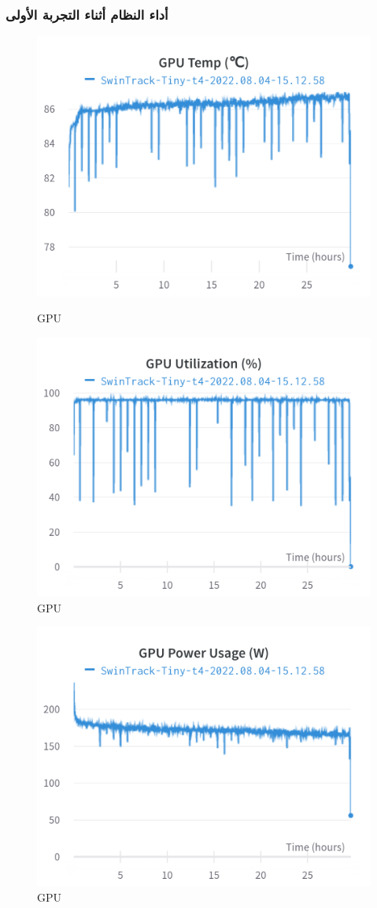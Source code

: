 \subsubsection{أداء النظام أثناء التجربة الأولى}
\begin{figure}[H]
	\includegraphics[width=0.7\linewidth]{charts/Section-4-Panel-10-ez7r8q2s1}
	\caption{
		GPU
		}
	\endminipage\hfill
	\includegraphics[width=0.7\linewidth]{charts/Section-4-Panel-11-7ugto7ti8}
	\caption{
		GPU
		}
	\endminipage
\end{figure}
\begin{figure}[H]
	\includegraphics[width=0.7\linewidth]{charts/Section-4-Panel-6-0i8v5s4ys}
	\caption{GPU
		}
	\endminipage\hfill
\end{figure}
